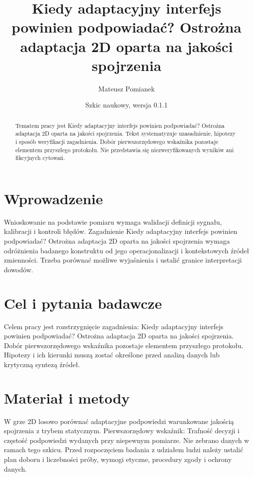 \documentclass[11pt,a4paper]{article}
\title{Kiedy adaptacyjny interfejs powinien podpowiadać? Ostrożna adaptacja 2D oparta na jakości spojrzenia}
\author{Mateusz Pomianek}
\date{Szkic naukowy, wersja 0.1.1}
\begin{document}
\maketitle

\begin{abstract}

Tematem pracy jest Kiedy adaptacyjny interfejs powinien podpowiadać? Ostrożna adaptacja 2D oparta na jakości spojrzenia. Tekst systematyzuje uzasadnienie, hipotezy i sposób weryfikacji zagadnienia. Dobór pierwszorzędowego wskaźnika pozostaje elementem przyszłego protokołu. Nie przedstawia się niezweryfikowanych wyników ani fikcyjnych cytowań.

\end{abstract}

\section{Wprowadzenie}

Wnioskowanie na podstawie pomiaru wymaga walidacji definicji sygnału, kalibracji i kontroli błędów. Zagadnienie Kiedy adaptacyjny interfejs powinien podpowiadać? Ostrożna adaptacja 2D oparta na jakości spojrzenia wymaga odróżnienia badanego konstruktu od jego operacjonalizacji i kontekstowych źródeł zmienności. Trzeba porównać możliwe wyjaśnienia i ustalić granice interpretacji dowodów.

\section{Cel i pytania badawcze}

Celem pracy jest rozstrzygnięcie zagadnienia: Kiedy adaptacyjny interfejs powinien podpowiadać? Ostrożna adaptacja 2D oparta na jakości spojrzenia. Dobór pierwszorzędowego wskaźnika pozostaje elementem przyszłego protokołu. Hipotezy i ich kierunki muszą zostać określone przed analizą danych lub krytyczną syntezą źródeł.

\section{Materiał i metody}

W grze 2D losowo porównać adaptacyjne podpowiedzi warunkowane jakością spojrzenia z trybem statycznym. Pierwszorzędowy wskaźnik: Trafność decyzji i częstość podpowiedzi wydanych przy niepewnym pomiarze. Nie zebrano danych w ramach tego szkicu. Przed rozpoczęciem badania z udziałem ludzi należy ustalić plan doboru i liczebności próby, wymogi etyczne, procedury zgody i ochrony danych.
\end{document}
